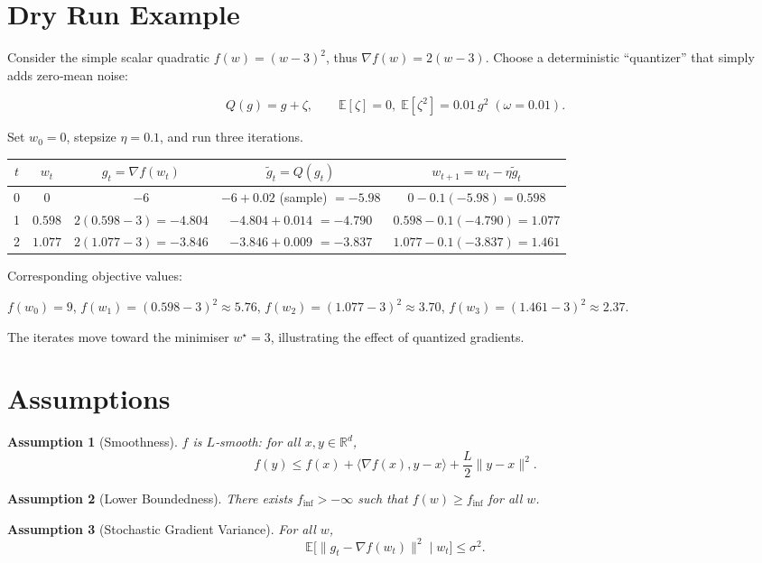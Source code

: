\documentclass{article}
\newtheorem{assumption}{Assumption}
\newcommand{\EE}{\mathbb{E}}
\newcommand{\RR}{\mathbb{R}}
\begin{document}
\section*{Dry Run Example}
Consider the simple scalar quadratic $f(w)=(w-3)^{2}$, thus $\nabla f(w)=2(w-3)$.  
Choose a deterministic ``quantizer'' that simply adds zero‑mean noise:  

\[
Q(g)=g+\zeta,\qquad \EE[\zeta]=0,\;\EE[\zeta^{2}]=0.01\,g^{2}\;( \omega=0.01).
\]

Set $w_{0}=0$, stepsize $\eta=0.1$, and run three iterations.

\begin{center}
\begin{tabular}{c|c|c|c|c}
$t$ & $w_t$ & $g_t= \nabla f(w_t)$ & $\tilde g_t=Q(g_t)$ & $w_{t+1}=w_t-\eta\tilde g_t$ \\ \hline
0 & 0 & $-6$ & $-6+0.02$ (sample) $=-5.98$ & $0-0.1(-5.98)=0.598$ \\
1 & $0.598$ & $2(0.598-3)=-4.804$ & $-4.804+0.014$ $=-4.790$ & $0.598-0.1(-4.790)=1.077$ \\
2 & $1.077$ & $2(1.077-3)=-3.846$ & $-3.846+0.009$ $=-3.837$ & $1.077-0.1(-3.837)=1.461$
\end{tabular}
\end{center}

Corresponding objective values:  

$f(w_0)=9$, $f(w_1)= (0.598-3)^2\approx5.76$, $f(w_2)= (1.077-3)^2\approx3.70$, $f(w_3)= (1.461-3)^2\approx2.37$.  

The iterates move toward the minimiser $w^\star=3$, illustrating the effect of quantized gradients.

\section*{Assumptions}
\begin{assumption}[Smoothness]\label{as:smooth}
$f$ is $L$‑smooth: for all $x,y\in\RR^{d}$,
\[
f(y)\le f(x)+\langle\nabla f(x),y-x\rangle+\frac{L}{2}\|y-x\|^{2}. \tag{A1}
\]
\end{assumption}

\begin{assumption}[Lower Boundedness]\label{as:lb}
There exists $f_{\inf}>-\infty$ such that $f(w)\ge f_{\inf}$ for all $w$. 
\end{assumption}

\begin{assumption}[Stochastic Gradient Variance]\label{as:var}
For all $w$, 
\[
\EE\big[\|g_t-\nabla f(w_t)\|^{2}\mid w_t\big]\le\sigma^{2}. \tag{A3}
\]
\end{assumption}
\end{document}
